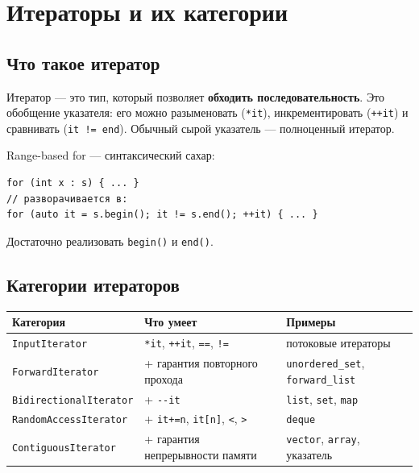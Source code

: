 \documentclass[a4paper,12pt]{article}
\begin{document}
\newpage
\section{Итераторы и их категории}

\subsection{Что такое итератор}

Итератор --- это тип, который позволяет \textbf{обходить последовательность}.
Это обобщение указателя: его можно разыменовать (\texttt{*it}),
инкрементировать (\texttt{++it}) и сравнивать (\texttt{it != end}).
Обычный сырой указатель --- полноценный итератор.

Range-based for --- синтаксический сахар:
\begin{lstlisting}
for (int x : s) { ... }
// разворачивается в:
for (auto it = s.begin(); it != s.end(); ++it) { ... }
\end{lstlisting}
Достаточно реализовать \texttt{begin()} и \texttt{end()}.

\subsection{Категории итераторов}

\begin{center}
\begin{tabular}{lp{5.2cm}p{4cm}}
\toprule
\textbf{Категория} & \textbf{Что умеет} & \textbf{Примеры} \\
\midrule
\texttt{InputIterator}
    & \texttt{*it}, \texttt{++it}, \texttt{==}, \texttt{!=}
    & потоковые итераторы \\
\addlinespace
\texttt{ForwardIterator}
    & + гарантия повторного прохода
    & \texttt{unordered\_set}, \texttt{forward\_list} \\
\addlinespace
\texttt{BidirectionalIterator}
    & + \texttt{-{}-it}
    & \texttt{list}, \texttt{set}, \texttt{map} \\
\addlinespace
\texttt{RandomAccessIterator}
    & + \texttt{it+=n}, \texttt{it[n]}, \texttt{<}, \texttt{>}
    & \texttt{deque} \\
\addlinespace
\texttt{ContiguousIterator}
    & + гарантия непрерывности памяти
    & \texttt{vector}, \texttt{array}, указатель \\
\bottomrule
\end{tabular}
\end{center}
\end{document}
